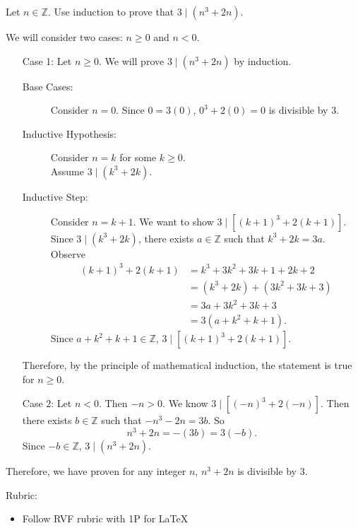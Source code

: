 \documentclass{article}
\newcommand{\Z}{\mathbb{Z}}
\theoremstyle{definition}
\begin{document}
\begin{question}
    Let $n\in \Z$. Use induction to prove that $3 \mid (n^3+2n)$. 
\end{question}
\begin{solution}
        We will consider two cases: $n\geq 0$ and $n<0$.
    \begin{itemize}
        \item[Case 1:] Let $n\geq 0$. We will prove $3 \mid (n^3+2n)$ by induction.
	\begin{description}
	\item[Base Cases: ] Consider $n=0$. Since $0=3(0)$, $0^3+2(0)=0$ is divisible by 3.
	
	\item[Inductive Hypothesis: ] Consider $n=k$ for some $k\geq 0$.\\ Assume $3 \mid (k^3+2k)$.
	
	\item[Inductive Step: ] Consider $n=k+1$. We want to show $3\mid [(k+1)^3+2(k+1)]$. Since $3 \mid (k^3+2k)$, there exists $a\in \Z$ such that $k^3+2k=3a$. Observe
 \begin{align*}
     (k+1)^3 + 2(k+1) &= k^3+3k^2+3k+1 + 2k +2\\
     &= (k^3+2k) + (3k^2+3k+3)\\
     &= 3a + 3k^2+3k+3\\
     & = 3 (a + k^2+k+1).
 \end{align*}
 Since $a + k^2+k+1\in \Z$, $3\mid [(k+1)^3+2(k+1)]$.
	\end{description}
	Therefore, by the principle of mathematical induction, the statement is true for $n\geq 0$.

 \item[Case 2:] Let $n<0$. Then $-n>0$. We know $3 \mid [(-n)^3+2(-n)]$. Then there exists $b\in \Z$ such that $-n^3-2n=3b$. So 
 \[
 n^3+2n = -(3b) = 3 (-b).
 \]
 Since $-b\in\Z$, $3\mid (n^3+2n)$.

 \end{itemize}

 Therefore, we have proven for any integer $n$, $n^3+2n$ is divisible by 3.
	
{\color{red} Rubric:
\begin{itemize}
\item Follow RVF rubric with 1P for \LaTeX
\end{itemize}}
\end{solution}
\end{document}
